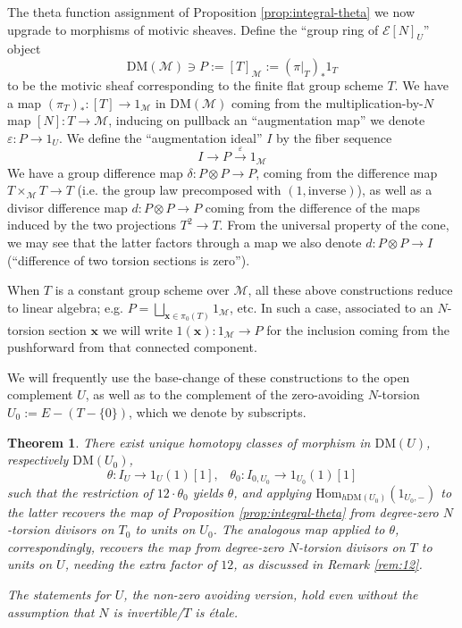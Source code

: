 \documentclass[a4paper,reqno,11pt]{amsart}
\theoremstyle{plain}
\newtheorem{theorem}{Theorem}[section]
\theoremstyle{definition}
\theoremstyle{remark}
\newcommand{\DM}{\mathrm{DM}}
\newcommand{\Hom}{\mathrm{Hom}}
\begin{document}
The theta function assignment of Proposition \ref{prop:integral-theta} we now upgrade to morphisms of motivic sheaves. Define the ``group ring of $\mathcal{E}[N]_U$'' object
\[
    \DM(\mathcal{M}) \ni P :=[T]_{\mathcal{M}}:= (\pi|_T)_*1_T
\]
to be the motivic sheaf corresponding to the finite flat group scheme $T$. We have a map $(\pi_T)_*:[T] \to 1_{\mathcal{M}}$ in $\DM(\mathcal{M})$ coming from the multiplication-by-$N$ map $[N]:T\to \mathcal{M}$, inducing on pullback an ``augmentation map'' we denote $\varepsilon: P \to 1_U$. We define the ``augmentation ideal'' $I$ by the fiber sequence
\[
    I\to P\xrightarrow{\varepsilon} 1_{\mathcal{M}}
\]
We have a group difference map $\delta: P\otimes P \to P$, coming from the difference map $T\times_{\mathcal{M}} T \to T$ (i.e. the group law precomposed with $(1, \mathrm{inverse})$), as well as a divisor difference map $d: P\otimes P\to P$ coming from the difference of the maps induced by the two projections $T^2\to T$. From the universal property of the cone, we may see that the latter factors through a map we also denote $d: P\otimes P \to I$ (``difference of two torsion sections is zero''). 

When $T$ is a constant group scheme over $\mathcal{M}$, all these above constructions reduce to linear algebra; e.g. $P= \bigsqcup_{\mathbf{x} \in \pi_0(T)} 1_{\mathcal{M}}$, etc. In such a case, associated to an $N$-torsion section $\mathbf{x}$ we will write $1(\mathbf{x}):1_{\mathcal{M}} \to P$ for the inclusion coming from the pushforward from that connected component. 

We will frequently use the base-change of these constructions to the open complement $U$, as well as to the complement of the zero-avoiding $N$-torsion $U_0:= E - (T-\{0\})$, which we denote by subscripts.


\begin{theorem} \label{thm:motivic-integral-theta}
    There exist unique homotopy classes of morphism in $\DM(U)$, respectively $\DM(U_0)$,
    \[
    \theta: I_U\to 1_U(1)[1], \;\;\; \theta_0: I_{0, U_0} \to 1_{U_0}(1)[1] 
    \]
    such that the restriction of $12\cdot \theta_0$ yields $\theta$, and applying $\Hom_{h\DM(U_0)}(1_{U_0,-})$ to the latter recovers the map of Proposition \ref{prop:integral-theta} from degree-zero $N$-torsion divisors on $T_0$ to units on $U_0$. The analogous map applied to $\theta$, correspondingly, recovers the map from degree-zero $N$-torsion divisors on $T$ to units on $U$, needing the extra factor of $12$, as discussed in Remark \ref{rem:12}.

    The statements for $U$, the non-zero avoiding version, hold even without the assumption that $N$ is invertible/$T$ is \'{e}tale.
\end{theorem}
\end{document}
